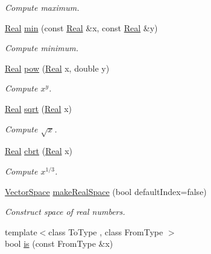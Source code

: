 \begin{DoxyCompactItemize}
\begin{DoxyCompactList}\small\item\em Compute maximum. \end{DoxyCompactList}\item 
\hyperlink{classSpacy_1_1Real}{Real} \hyperlink{namespaceSpacy_ab0a9ae2652cc3a2701e33c6291c4c34a}{min} (const \hyperlink{classSpacy_1_1Real}{Real} \&x, const \hyperlink{classSpacy_1_1Real}{Real} \&y)\hypertarget{namespaceSpacy_ab0a9ae2652cc3a2701e33c6291c4c34a}{}\label{namespaceSpacy_ab0a9ae2652cc3a2701e33c6291c4c34a}

\begin{DoxyCompactList}\small\item\em Compute minimum. \end{DoxyCompactList}\item 
\hyperlink{classSpacy_1_1Real}{Real} \hyperlink{namespaceSpacy_acffef7eb409609abe7ad87aaad28503f}{pow} (\hyperlink{classSpacy_1_1Real}{Real} x, double y)\hypertarget{namespaceSpacy_acffef7eb409609abe7ad87aaad28503f}{}\label{namespaceSpacy_acffef7eb409609abe7ad87aaad28503f}

\begin{DoxyCompactList}\small\item\em Compute $x^y$. \end{DoxyCompactList}\item 
\hyperlink{classSpacy_1_1Real}{Real} \hyperlink{namespaceSpacy_aa779bb3e2bf547cd0ed9ef47b3d711a3}{sqrt} (\hyperlink{classSpacy_1_1Real}{Real} x)\hypertarget{namespaceSpacy_aa779bb3e2bf547cd0ed9ef47b3d711a3}{}\label{namespaceSpacy_aa779bb3e2bf547cd0ed9ef47b3d711a3}

\begin{DoxyCompactList}\small\item\em Compute $\sqrt{x}$. \end{DoxyCompactList}\item 
\hyperlink{classSpacy_1_1Real}{Real} \hyperlink{namespaceSpacy_a64093cc47f73b71ba92bc0dd37e9572b}{cbrt} (\hyperlink{classSpacy_1_1Real}{Real} x)\hypertarget{namespaceSpacy_a64093cc47f73b71ba92bc0dd37e9572b}{}\label{namespaceSpacy_a64093cc47f73b71ba92bc0dd37e9572b}

\begin{DoxyCompactList}\small\item\em Compute $ x^{1/3} $. \end{DoxyCompactList}\item 
\hyperlink{classSpacy_1_1VectorSpace}{Vector\+Space} \hyperlink{namespaceSpacy_a4f4b05902653c5fc8d6411142dcb352f}{make\+Real\+Space} (bool default\+Index=false)
\begin{DoxyCompactList}\small\item\em Construct space of real numbers. \end{DoxyCompactList}\item 
{\footnotesize template$<$class To\+Type , class From\+Type $>$ }\\bool \hyperlink{namespaceSpacy_ae44bfd08fa77272bab4149665b26233a}{is} (const From\+Type \&x)\hypertarget{namespaceSpacy_ae44bfd08fa77272bab4149665b26233a}{}\label{namespaceSpacy_ae44bfd08fa77272bab4149665b26233a}


\end{DoxyCompactItemize}
